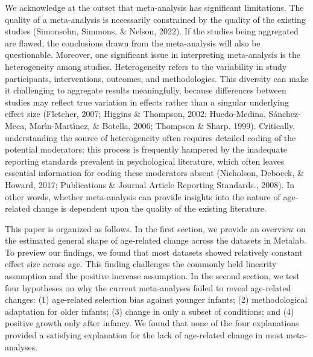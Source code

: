 \documentclass[
  man]{apa6}
\begin{document}
We acknowledge at the outset that meta-analysis has significant limitations. The quality of a meta-analysis is necessarily constrained by the quality of the existing studies (Simonsohn, Simmons, \& Nelson, 2022). If the studies being aggregated are flawed, the conclusions drawn from the meta-analysis will also be questionable. Moreover, one significant issue in interpreting meta-analysis is the heterogeneity among studies. Heterogeneity refers to the variability in study participants, interventions, outcomes, and methodologies. This diversity can make it challenging to aggregate results meaningfully, because differences between studies may reflect true variation in effects rather than a singular underlying effect size (Fletcher, 2007; Higgins \& Thompson, 2002; Huedo-Medina, Sánchez-Meca, Marı́n-Martı́nez, \& Botella, 2006; Thompson \& Sharp, 1999). Critically, understanding the source of heterogeneity often requires detailed coding of the potential moderators; this process is frequently hampered by the inadequate reporting standards prevalent in psychological literature, which often leaves essential information for coding these moderators absent (Nicholson, Deboeck, \& Howard, 2017; Publications \& Journal Article Reporting Standards., 2008). In other words, whether meta-analysis can provide insights into the nature of age-related change is dependent upon the quality of the existing literature.

This paper is organized as follows. In the first section, we provide an overview on the estimated general shape of age-related change across the datasets in Metalab. To preview our findings, we found that most datasets showed relatively constant effect size across age. This finding challenges the commonly held linearity assumption and the positive increase assumption. In the second section, we test four hypotheses on why the current meta-analyses failed to reveal age-related changes: (1) age-related selection bias against younger infants; (2) methodological adaptation for older infants; (3) change in only a subset of conditions; and (4) positive growth only after infancy. We found that none of the four explanations provided a satisfying explanation for the lack of age-related change in most meta-analyses.
\end{document}
